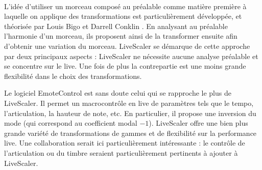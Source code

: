 \paragraph*{}
L'idée d'utiliser un morceau composé au préalable comme matière première à laquelle on applique des transformations est particulièrement développée, et théorisée par Louis Bigo et Darrell Conklin \cite{bigo2016viewpoint}. En analysant au préalable l'harmonie d'un morceau, ils proposent ainsi de la transformer ensuite afin d'obtenir une variation du morceau. LiveScaler se démarque de cette approche par deux principaux aspects : LiveScaler ne nécessite aucune analyse préalable et se concentre sur le live. Une fois de plus la contrepartie est une moins grande flexibilité dans le choix des transformations.

Le logiciel EmoteControl \cite{micallef2021emotecontrol} est sans doute celui qui se rapproche le plus de LiveScaler. Il permet un macrocontrôle en live de paramètres tels que le tempo, l'articulation, la hauteur de note, etc. En particulier, il propose une inversion du mode (qui correspond au coefficient modal $-1$).  LiveScaler offre une bien plus grande variété de transformations de gammes et de flexibilité sur la performance live. Une collaboration serait ici particulièrement intéressante : le contrôle de l'articulation ou du timbre seraient particulièrement pertinents à ajouter à LiveScaler.